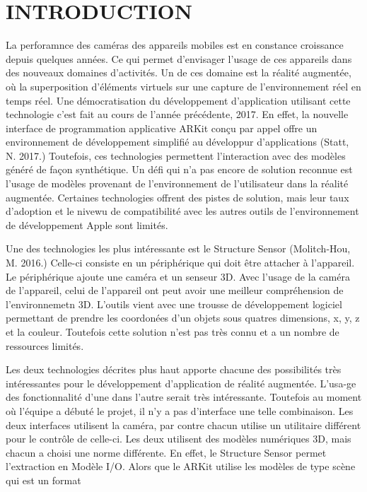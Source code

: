 \documentclass[letterpaper,twoside,12pt,french]{report}
\begin{document}
\chapter*{\uppercase{Introduction}}
La perforamnce des caméras des appareils mobiles est en constance croissance depuis quelques
années. Ce qui permet d'envisager l'usage de ces appareils dans des nouveaux domaines d'activités.
Un de ces domaine est la réalité augmentée, où la superposition d'éléments virtuels sur une
capture de l'environnement réel en temps réel. Une démocratisation du développement d'application
utilisant cette technologie c'est fait au cours de l'année précédente, 2017. En effet, la nouvelle
interface de programmation applicative ARKit conçu par appel offre un environnement de
développement simplifié au développur d'applications (Statt, N. 2017.) Toutefois, ces technologies
permettent l'interaction avec des modèles généré de façon synthétique. Un défi qui n'a pas encore
de solution reconnue est l'usage de modèles provenant de l'environnement de l'utilisateur dans la
réalité augmentée. Certaines technologies offrent des pistes de solution, mais leur taux d'adoption
et le nivewu de compatibilité avec les autres outils de l'environnement de développement Apple sont
limités.
\par
Une des technologies les plus intéressante est le Structure Sensor (Molitch-Hou, M. 2016.) Celle-ci
consiste en un périphérique qui doit être attacher à l'appareil. Le périphérique ajoute une caméra
et un senseur 3D. Avec l'usage de la caméra de l'appareil, celui de l'appareil ont peut avoir une
meilleur compréhension de l'environnemetn 3D. L'outils vient avec une trousse de développement
logiciel permettant de prendre les coordonées d'un objets sous quatres dimensions, x, y, z et la
couleur. Toutefois cette solution n'est pas très connu et a un nombre de ressources limités.
\par
Les deux technologies décrites plus haut apporte chacune des possibilités très intéressantes pour
le développement d'application de réalité augmentée. L'usa\hyp{}ge des fonctionnalité d'une dans l'autre
serait très intéressante. Toutefois au moment où l'équipe a débuté le projet, il n'y a pas
d'interface une telle combinaison. Les deux interfaces utilisent la caméra, par contre chacun
utilise un utilitaire différent pour le contrôle de celle-ci. Les deux utilisent des modèles
numériques 3D, mais chacun a choisi une norme différente. En effet, le Structure Sensor permet
l'extraction en Modèle I/O. Alors que le ARKit utilise les modèles de type scène qui est un format
\end{document}
